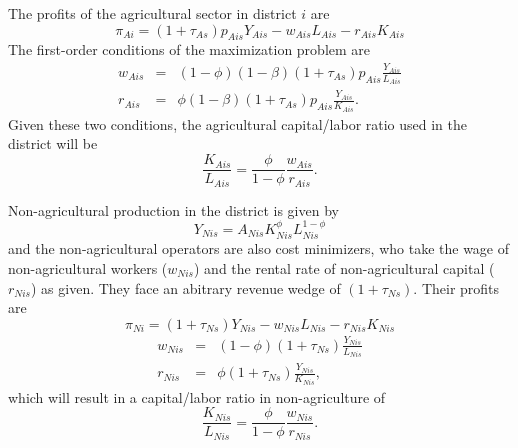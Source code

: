 \documentclass[11pt]{article}
\begin{document}
The profits of the agricultural sector in district $i$ are
\begin{equation}
	\pi_{Ai} = (1+\tau_{As}) p_{Ais} Y_{Ais} - w_{Ais} L_{Ais} - r_{Ais} K_{Ais}
\end{equation}
The first-order conditions of the maximization problem are
\begin{eqnarray}
    w_{Ais} &=& (1-\phi)(1-\beta) (1+\tau_{As}) p_{Ais} \frac{Y_{Ais}}{L_{Ais}} \\ \nonumber 
    r_{Ais} &=& \phi(1-\beta) (1+\tau_{As}) p_{Ais} \frac{Y_{Ais}}{K_{Ais}}. \label{EQ_factorprices}
\end{eqnarray}
Given these two conditions, the agricultural capital/labor ratio used in the district will be
\begin{equation}
	\frac{K_{Ais}}{L_{Ais}} = \frac{\phi}{1-\phi} \frac{w_{Ais}}{r_{Ais}}. \label{EQ_KLag}
\end{equation}

Non-agricultural production in the district is given by
\begin{equation}
	Y_{Nis} = A_{Nis} K_{Nis}^{\phi}L_{Nis}^{1-\phi} \label{EQ_nonag}
\end{equation}
and the non-agricultural operators are also cost minimizers, who take the wage of non-agricultural workers ($w_{Nis}$) and the rental rate of non-agricultural capital ($r_{Nis}$) as given. They face an abitrary revenue wedge of $(1+\tau_{Ns})$. Their profits are
\begin{equation}
	\pi_{Ni} = (1+\tau_{Ns}) Y_{Nis} - w_{Nis} L_{Nis} - r_{Nis} K_{Nis}
\end{equation}
\begin{eqnarray*}
    w_{Nis} &=& (1-\phi)(1+\tau_{Ns}) \frac{Y_{Nis}}{L_{Nis}} \\ 
    r_{Nis} &=& \phi (1+\tau_{Ns}) \frac{Y_{Nis}}{K_{Nis}},
\end{eqnarray*}
which will result in a capital/labor ratio in non-agriculture of
\begin{equation}
	\frac{K_{Nis}}{L_{Nis}} = \frac{\phi}{1-\phi} \frac{w_{Nis}}{r_{Nis}}. \label{EQ_KLnon}
\end{equation}
\end{document}
